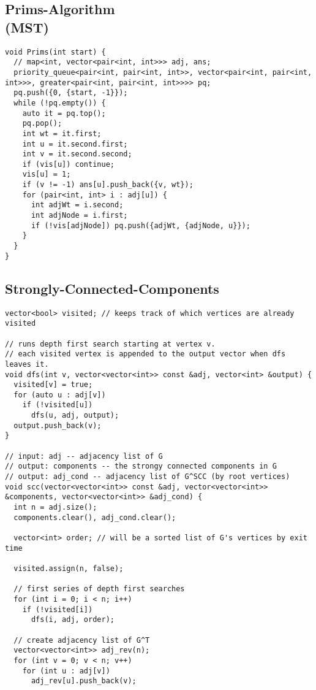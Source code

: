 \documentclass[10pt, a4paper]{article}
\begin{document}
\begin{multicols}{2}
\subsection{Prims-Algorithm\\(MST)}
\begin{lstlisting}
void Prims(int start) {
  // map<int, vector<pair<int, int>>> adj, ans;
  priority_queue<pair<int, pair<int, int>>, vector<pair<int, pair<int, int>>>, greater<pair<int, pair<int, int>>>> pq;
  pq.push({0, {start, -1}});
  while (!pq.empty()) {
    auto it = pq.top();
    pq.pop();
    int wt = it.first;
    int u = it.second.first;
    int v = it.second.second;
    if (vis[u]) continue;
    vis[u] = 1;
    if (v != -1) ans[u].push_back({v, wt});
    for (pair<int, int> i : adj[u]) {
      int adjWt = i.second;
      int adjNode = i.first;
      if (!vis[adjNode]) pq.push({adjWt, {adjNode, u}});
    }
  }
}
\end{lstlisting}
\subsection{Strongly-Connected-Components}
\begin{lstlisting}
vector<bool> visited; // keeps track of which vertices are already visited

// runs depth first search starting at vertex v.
// each visited vertex is appended to the output vector when dfs leaves it.
void dfs(int v, vector<vector<int>> const &adj, vector<int> &output) {
  visited[v] = true;
  for (auto u : adj[v])
    if (!visited[u])
      dfs(u, adj, output);
  output.push_back(v);
}

// input: adj -- adjacency list of G
// output: components -- the strongy connected components in G
// output: adj_cond -- adjacency list of G^SCC (by root vertices)
void scc(vector<vector<int>> const &adj, vector<vector<int>> &components, vector<vector<int>> &adj_cond) {
  int n = adj.size();
  components.clear(), adj_cond.clear();

  vector<int> order; // will be a sorted list of G's vertices by exit time

  visited.assign(n, false);

  // first series of depth first searches
  for (int i = 0; i < n; i++)
    if (!visited[i])
      dfs(i, adj, order);

  // create adjacency list of G^T
  vector<vector<int>> adj_rev(n);
  for (int v = 0; v < n; v++)
    for (int u : adj[v])
      adj_rev[u].push_back(v);


\end{lstlisting}
\end{multicols}
\end{document}
